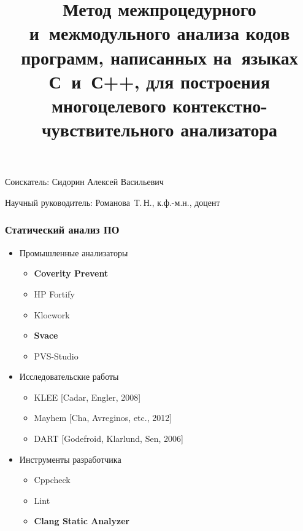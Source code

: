 \documentclass[10pt,gray]{beamer}
\title{Метод межпроцедурного и~межмодульного анализа кодов программ, написанных на~языках  С~и~С++, для построения многоцелевого контекстно-чувствительного анализатора}
\begin{document}
\begin{frame}
  \bigskip
  \bigskip
  \bigskip
  \begin{flushright}%

  Соискатель: Сидорин Алексей Васильевич
  
  Научный руководитель: Романова~Т.\,Н., к.ф.-м.н., доцент
  \end{flushright}
  \bigskip

\end{frame}


\begin{frame}
\frametitle{Статический анализ ПО}
\begin{itemize}
  \item Промышленные анализаторы
  \begin{itemize}
    \item \textbf{Coverity Prevent}
    \item HP Fortify
    \item Klocwork
    \item \textbf{Svace}
    \item PVS-Studio
  \end{itemize}
  \item Исследовательские работы
  \begin{itemize}
  \item KLEE [Cadar, Engler, 2008]
  \item Mayhem [Cha, Avreginos, etc., 2012]
  \item DART [Godefroid, Klarlund, Sen, 2006]
  \end{itemize}
  \item Инструменты разработчика
    \begin{itemize}
    \item Cppcheck
    \item Lint
    \item \textbf{Clang Static Analyzer}
    \end{itemize}

\end{itemize}
\end{frame}
\end{document}

